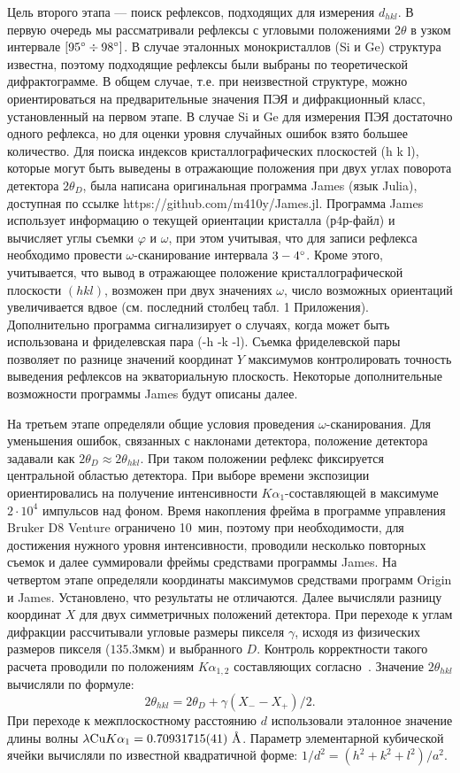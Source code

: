 Цель второго этапа --- поиск рефлексов, подходящих для измерения $d_{hkl}$.
В первую очередь мы рассматривали рефлексы с угловыми положениями $2\theta$ в узком интервале $[95^\circ\div98^\circ]$.
В случае эталонных монокристаллов (Si и Ge) структура известна, поэтому подходящие рефлексы были выбраны по теоретической дифрактограмме.
В общем случае, т.е. при неизвестной структуре, можно ориентироваться на предварительные значения ПЭЯ и дифракционный класс, установленный на первом этапе.
В случае Si и Ge для измерения ПЭЯ достаточно одного рефлекса, но для оценки уровня случайных ошибок взято большее количество.
Для поиска индексов кристаллографических плоскостей \hkl(h k l), которые могут быть выведены в отражающие положения при двух углах поворота детектора $2\theta_D$, была написана оригинальная программа James (язык Julia), доступная по ссылке https://github.com/m410y/James.jl.
Программа James использует информацию о текущей ориентации кристалла (р4р-файл) и вычисляет углы съемки $\varphi$ и $\omega$, при этом учитывая, что для записи рефлекса необходимо провести $\omega$-сканирование интервала $3-4^\circ$.
Кроме этого, учитывается, что вывод в отражающее положение кристаллографической плоскости $(h k l)$, возможен при двух значениях $\omega$, число возможных ориентаций увеличивается вдвое (см. последний столбец табл. 1 Приложения).
Дополнительно программа сигнализирует о случаях, когда может быть использована и фриделевская пара \hkl(-h -k -l).
Съемка фриделевской пары позволяет по разнице значений координат $Y$ максимумов контролировать точность выведения рефлексов на экваториальную плоскость.
Некоторые дополнительные возможности программы James будут описаны далее.

На третьем этапе определяли общие условия проведения $\omega$-сканирования.
Для уменьшения ошибок, связанных с наклонами детектора, положение детектора задавали как $2\theta_D \approx 2\theta_{hkl}$.
При таком положении рефлекс фиксируется центральной областью детектора.
При выборе времени экспозиции ориентировались на получение интенсивности $K\alpha_1$-составляющей в максимуме $2 \cdot 10^4$ импульсов над фоном.
Время накопления фрейма в программе управления Bruker D8 Venture ограничено 10~мин, поэтому при необходимости, для достижения нужного уровня интенсивности, проводили несколько повторных съемок и далее суммировали фреймы средствами программы James. 
На четвертом этапе определяли координаты максимумов средствами программ Origin и James. Установлено, что результаты не отличаются.
Далее вычисляли разницу координат $X$ для двух симметричных положений детектора.
При переходе к углам дифракции рассчитывали угловые размеры пикселя $\gamma$, исходя из физических размеров пикселя ($135.3\unit{мкм}$) и выбранного $D$.
Контроль корректности такого расчета проводили по положениям $K\alpha_{1,2}$ составляющих согласно~\cite{Gromilov:2022}. 
Значение $2\theta_{hkl}$ вычисляли по формуле:
\begin{equation}\label{eq:bond2}
    2\theta_{hkl} = 2\theta_D + \gamma (X_- - X_+) / 2.
\end{equation}
При переходе к межплоскостному расстоянию $d$ использовали эталонное значение длины волны $\lambda \text{Cu} K\alpha_1 = 0.70931715(41)\ \text{\AA}$.
Параметр элементарной кубической ячейки вычисляли по известной квадратичной форме: $1/d^2 = (h^2 + k^2 +l^2)/a^2$.
